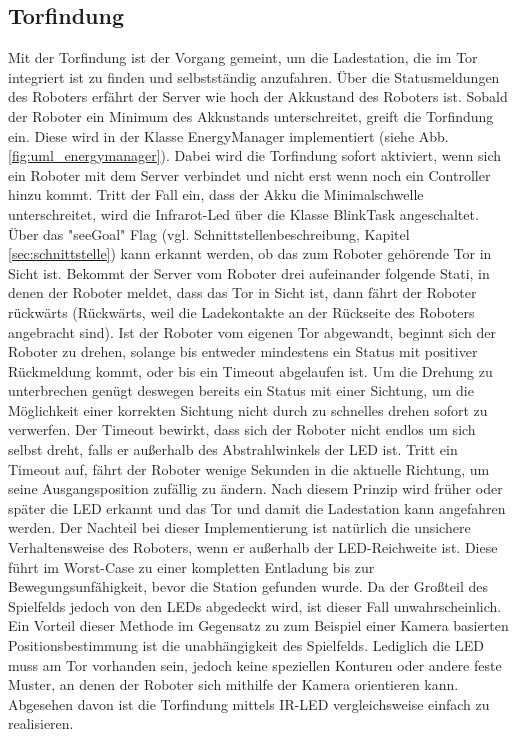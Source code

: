 \subsection{Torfindung}
Mit der Torfindung ist der Vorgang gemeint, um die Ladestation, die im Tor integriert ist zu finden und selbstständig anzufahren. Über die Statusmeldungen des Roboters erfährt der Server wie hoch der Akkustand des Roboters ist. Sobald der Roboter ein Minimum des Akkustands unterschreitet, greift die Torfindung ein. Diese wird in der Klasse EnergyManager implementiert (siehe Abb. \ref{fig:uml_energymanager}). Dabei wird die Torfindung sofort aktiviert, wenn sich ein Roboter mit dem Server verbindet und nicht erst wenn noch ein Controller hinzu kommt. Tritt der Fall ein, dass der Akku die Minimalschwelle unterschreitet, wird die Infrarot-Led über die Klasse BlinkTask angeschaltet. Über das "seeGoal" Flag (vgl. Schnittstellenbeschreibung, Kapitel \ref{sec:schnittstelle}) kann erkannt werden, ob das zum Roboter gehörende Tor in Sicht ist. Bekommt der Server vom Roboter drei aufeinander folgende Stati, in denen der Roboter meldet, dass das Tor in Sicht ist, dann fährt der Roboter rückwärts (Rückwärts, weil die Ladekontakte an der Rückseite des Roboters angebracht sind). Ist der Roboter vom eigenen Tor abgewandt, beginnt sich der Roboter zu drehen, solange bis entweder mindestens ein Status mit positiver Rückmeldung kommt, oder bis ein Timeout abgelaufen ist. Um die Drehung zu unterbrechen genügt deswegen bereits ein Status mit einer Sichtung, um die Möglichkeit einer korrekten Sichtung nicht durch zu schnelles drehen sofort zu verwerfen. Der Timeout bewirkt, dass sich der Roboter nicht endlos um sich selbst dreht, falls er außerhalb des Abstrahlwinkels der LED ist. Tritt ein Timeout auf, fährt der Roboter wenige Sekunden in die aktuelle Richtung, um seine Ausgangsposition zufällig zu ändern. Nach diesem Prinzip wird früher oder später die LED erkannt und das Tor und damit die Ladestation kann angefahren werden. 
Der Nachteil bei dieser Implementierung ist natürlich die unsichere Verhaltensweise des Roboters, wenn er außerhalb der LED-Reichweite ist. Diese führt im Worst-Case zu einer kompletten Entladung bis zur Bewegungsunfähigkeit, bevor die Station gefunden wurde. Da der Großteil des Spielfelds jedoch von den LEDs abgedeckt wird, ist dieser Fall unwahrscheinlich. Ein Vorteil dieser Methode im Gegensatz zu zum Beispiel einer Kamera basierten Positionsbestimmung ist die unabhängigkeit des Spielfelds. Lediglich die LED muss am Tor vorhanden sein, jedoch keine speziellen Konturen oder andere feste Muster, an denen der Roboter sich mithilfe der Kamera orientieren kann. Abgesehen davon ist die Torfindung mittels IR-LED vergleichsweise einfach zu realisieren.

